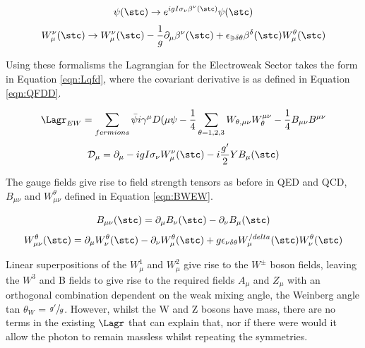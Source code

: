 \begin{equation}
\psi(\stc) \rightarrow e^{igI\sigma_{\nu} \beta^{\nu} (\stc)}\psi(\stc)
\end{equation}
\begin{equation}
W_{\mu}^{\nu}(\stc) \rightarrow W_{\mu}^{\nu}(\stc) - \frac{1}{g}\partial_{\mu}\beta^{\nu}(\stc) + \epsilon_{\ni \delta \theta}\beta^{\delta}(\stc)W_{\mu}^{\theta}(\stc)
\label{eqn:ewsu2}
\end{equation}

Using these formalisms the Lagrangian for the Electroweak Sector takes the form in Equation \ref{eqn:Lqfd}, where the covariant derivative is as defined in Equation \ref{eqn:QFDD}. 

\begin{equation}
\Lagr_{EW} = \sum_{fermions} \bar{\psi}i\gamma^{\mu}D({\mu}\psi - \frac{1}{4}\sum_{\theta = 1,2,3} W_{\theta,\mu\nu}W_{\theta}^{\mu\nu} - \frac{1}{4}B_{\mu\nu}B^{\mu\nu}
\label{eqn:Lqfd}
\end{equation}
\begin{equation}
\mathcal{D}_{\mu} = \partial_{\mu}-igI\sigma_{\nu}W_{\mu}^{\nu}(\stc) - i\frac{g'}{2}YB_{\mu}(\stc)
\label{eqn:QFDD}
\end{equation}

The gauge fields give rise to field strength tensors as before in QED and QCD, $B_{\mu\nu}$ and $W_{\mu\nu}^{\theta}$ defined in Equation \ref{eqn:BWEW}. 

\begin{equation}
B_{\mu\nu}(\stc) = \partial_{\mu}B_{\nu}(\stc) - \partial_{\nu}B_{\mu}(\stc)
\end{equation}
\begin{equation}
W_{\mu\nu}^{\theta}(\stc) = \partial_{\mu}W_{\nu}^{\theta}(\stc) - \partial_{\nu}W_{\mu}^{\theta}(\stc) + g\epsilon_{\nu \delta \theta}W_{\mu}^{/delta}(\stc)W_{\nu}^{\theta}(\stc)
\label{eqn:BWEW}
\end{equation}

Linear superpositions of the $W^{1}_{\mu}$ and $W^{2}_{\mu}$ give rise to the $W^{\pm}$ boson fields, leaving the $W^{3}$ and B fields to give rise to the required fields $A_{\mu}$ and $Z_{\mu}$ with an orthogonal combination dependent on the weak mixing angle, the Weinberg angle tan $\theta_{W}$ = $\sfrac{g'}{g}$. However, whilst the W and Z bosons have mass, there are no terms in the existing $\Lagr$ that can explain that, nor if there were would it allow the photon to remain massless whilst repeating the symmetries. 

